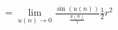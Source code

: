 \documentclass[preview]{standalone}
\begin{document}
\begin{align*}
= \lim_{u(n) \to 0} \frac {\sin \left(u(n)\right)} {\frac {u(n)}{\tau} } \frac {1} {2} r^2
\end{align*}
\end{document}
